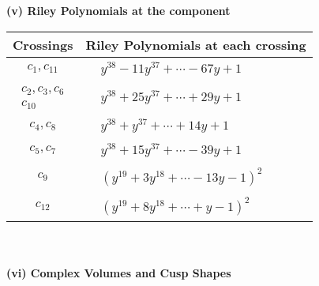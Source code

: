 \documentclass[1p]{elsarticle_modified}
\theoremstyle{definition}
\begin{document}
\newpage\renewcommand{\arraystretch}{1}
\flushleft \textbf{(v) Riley Polynomials at the component}\newline \\
\begin{tabular}{m{50pt}|m{274pt}}
Crossings & \hspace{64pt}Riley Polynomials at each crossing \\
\hline $$\begin{aligned}c_{1},c_{11}\end{aligned}$$&$\begin{aligned}
&y^{38}-11 y^{37}+\cdots-67 y+1
\end{aligned}$\\
\hline $$\begin{aligned}c_{2},c_{3},c_{6}\\c_{10}\end{aligned}$$&$\begin{aligned}
&y^{38}+25 y^{37}+\cdots+29 y+1
\end{aligned}$\\
\hline $$\begin{aligned}c_{4},c_{8}\end{aligned}$$&$\begin{aligned}
&y^{38}+y^{37}+\cdots+14 y+1
\end{aligned}$\\
\hline $$\begin{aligned}c_{5},c_{7}\end{aligned}$$&$\begin{aligned}
&y^{38}+15 y^{37}+\cdots-39 y+1
\end{aligned}$\\
\hline $$\begin{aligned}c_{9}\end{aligned}$$&$\begin{aligned}
&(y^{19}+3 y^{18}+\cdots-13 y-1)^{2}
\end{aligned}$\\
\hline $$\begin{aligned}c_{12}\end{aligned}$$&$\begin{aligned}
&(y^{19}+8 y^{18}+\cdots+y-1)^{2}
\end{aligned}$\\
\hline
\end{tabular}\\~\\
\newpage\flushleft \textbf{(vi) Complex Volumes and Cusp Shapes}
\end{document}
